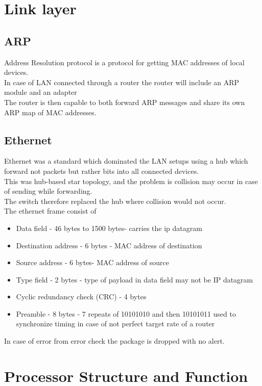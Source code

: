\documentclass[12pt, a4paper]{article}
\begin{document}
	\section{Link layer}
		\subsection{ARP}
			Address Resolution protocol is a protocol for getting MAC addresses of local devices.\\
			In case of LAN connected through a router the router will include an ARP module and an adapter\\
			The router is then capable to both forward ARP messages and share its own ARP map of MAC addresses.\\
		\subsection{Ethernet}
			Ethernet was a standard which dominated the LAN setups using a hub which forward not packets but rather bits into all connected devices.\\
			This was hub-based star topology, and the problem is collision may occur in case of sending while forwarding.\\
			The switch therefore replaced the hub where collision would not occur.\\
			The ethernet frame consist of\\
			\begin{itemize}
				\item Data field - 46 bytes to 1500 bytes- carries the ip datagram
				\item Destination address - 6 bytes - MAC address of destination
				\item Source address - 6 bytes- MAC address of source
				\item Type field - 2 bytes - type of payload in data field may not be IP datagram
				\item Cyclic redundancy check (CRC) - 4 bytes
				\item Preamble - 8 bytes - 7 repeats of 10101010 and then 10101011 used to synchronize timing in case of not perfect target rate of a router
			\end{itemize}
			In case of error from error check the package is dropped with no alert.\\
	\section{Processor Structure and Function}
\end{document}

